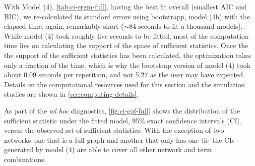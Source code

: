\documentclass[review, nonatbib,doubleblind]{elsarticle/elsarticle}
\begin{document}
With Model (4), \autoref{tab:ci-ergm-full}, having the best fit overall (smallest AIC and BIC), we re-calculated its standard errors using bootstrapp, model (4b) with the elapsed time, again, remarkably short ($\sim$84 seconds to fit a thousand models). While model (4) took roughly five seconds to be fitted, most of the computation time lies on calculating the support of the space of sufficient statistics. Once the the support of the sufficient statistics has been calculated, the optimization takes only a fraction of the time, which is why the bootstrap version of model (4) took about 0.09 seconds per repetition, and not 5.27 as the user may have expected. Details on the computational resources used for this section and the simulation studies are shown in \ref{sec:computing-details}.

As part of the \textit{ad hoc} diagnostics, \autoref{fig:ci-gof-full} shows the distribution of the sufficient statistic under the fitted model, 95\% exact confidence intervals (CI), versus the observed set of sufficient statistics. With the exception of two networks--one that is a full graph and another that only has one tie--the CIs generated by model (4) are able to cover all other network and term combinations.
\end{document}
